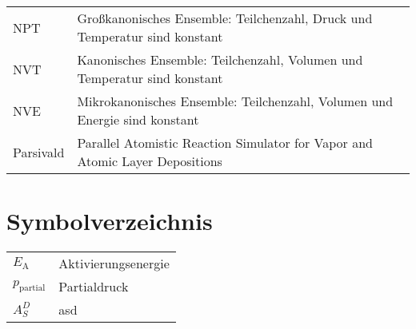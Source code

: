 \begin{tabularx}{\linewidth}{lll}
NPT        &   \multicolumn{2}{X}{Großkanonisches Ensemble: Teilchenzahl, Druck und Temperatur sind konstant}   \\
NVT        &   \multicolumn{2}{X}{Kanonisches Ensemble: Teilchenzahl, Volumen und Temperatur sind konstant}     \\
NVE        &   \multicolumn{2}{X}{Mikrokanonisches Ensemble: Teilchenzahl, Volumen und Energie sind konstant}   \\
Parsivald  &   \multicolumn{2}{X}{Parallel Atomistic Reaction Simulator for Vapor and Atomic Layer Depositions} \\

\end{tabularx}

%
%


\chapter*{Symbolverzeichnis}
\def\listacronymname{Symbolverzeichnis}

\begin{tabularx}{\linewidth}{ll}
$E_\text{A}$        &  Aktivierungsenergie \\
$p_\text{partial}$  &  Partialdruck \\
$A_S^D$ & asd \\
\end{tabularx}


\cleardoublepage
{} %
